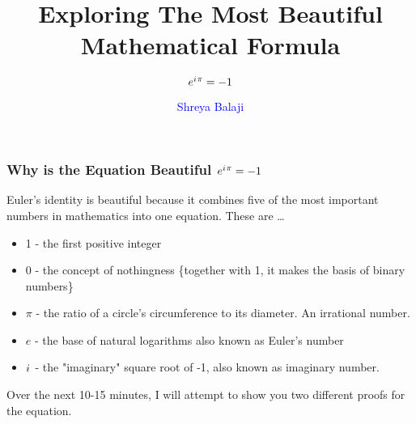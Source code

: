 \documentclass[10pt]{beamer}
\newcommand{\iu}{{i\mkern1mu}}
\begin{document}
\author{\textcolor{blue}{Shreya Balaji}}
\title{Exploring The Most Beautiful Mathematical Formula}
\subtitle{\huge\(e^{\iu \pi} = -1\)}


\begin{frame}[plain]
	\maketitle
\end{frame}

\begin{frame}
	\frametitle{Why is the Equation Beautiful \hspace{25pt} \textcolor{pink}{\Huge\(e^{\iu \pi} = -1\)}}
	
	Euler's identity is beautiful because it combines five of the most important numbers in mathematics into one equation. These are \dots
	\begin{itemize}
	\item 1 - the first positive integer
	\item 0 - the concept of nothingness \{together with 1, it makes the basis of binary numbers\}
	\item {\bf${\pi}$} - the ratio of a circle's circumference to its diameter. An irrational number.
	\item \large{$e$} - the base of natural logarithms also known as Euler's number
	\item \large{$\iu$} - the "imaginary" square root of -1, also known as imaginary number.
	\end{itemize}
Over the next 10-15 minutes, I will attempt to show you two different proofs for the equation.
	
\end{frame}
\end{document}
